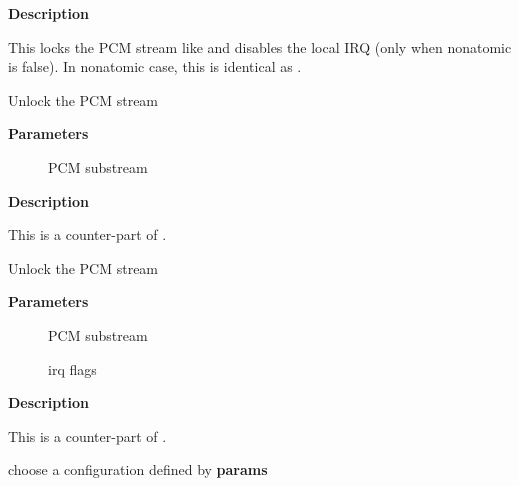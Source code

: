 \documentclass[a4paper,8pt,english]{sphinxmanual}
\begin{document}
\textbf{Description}

This locks the PCM stream like  and disables the local
IRQ (only when nonatomic is false).  In nonatomic case, this is identical
as .

\begin{fulllineitems}
\label{sound/kernel-api/alsa-driver-api:c.snd_pcm_stream_unlock_irq}
Unlock the PCM stream

\end{fulllineitems}


\textbf{Parameters}
\begin{description}
\item[{}] \leavevmode
PCM substream

\end{description}

\textbf{Description}

This is a counter-part of .

\begin{fulllineitems}
\label{sound/kernel-api/alsa-driver-api:c.snd_pcm_stream_unlock_irqrestore}
Unlock the PCM stream

\end{fulllineitems}


\textbf{Parameters}
\begin{description}
\item[{}] \leavevmode
PCM substream

\item[{}] \leavevmode
irq flags

\end{description}

\textbf{Description}

This is a counter-part of .

\begin{fulllineitems}
\label{sound/kernel-api/alsa-driver-api:c.snd_pcm_hw_params_choose}
choose a configuration defined by \textbf{params}

\end{fulllineitems}
\end{document}
